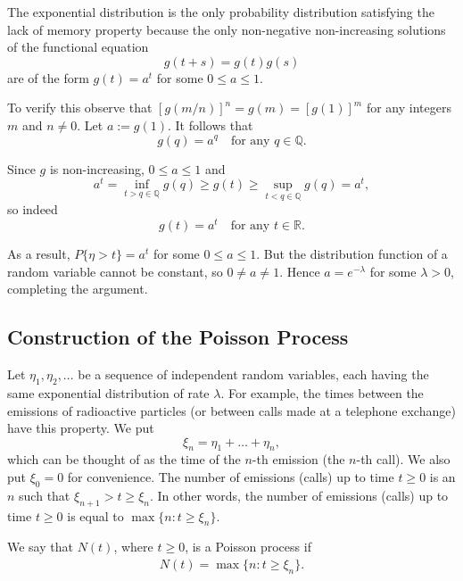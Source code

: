 \begin{Solution}
The exponential distribution is the only probability distribution satisfying the lack of memory property because the only non-negative non-increasing solutions of the functional equation
\[
g(t + s) = g(t) g(s)
\]
are of the form $g(t) = a^t$ for some $0 \leq a \leq 1$.

To verify this observe that $[g(m/n)]^n = g(m) = [g(1)]^m$ for any integers $m$ and $n \neq 0$. Let $a := g(1)$. It follows that
\[
g(q) = a^q \quad \text{for any } q \in \mathbb{Q}.
\]

Since $g$ is non-increasing, $0 \leq a \leq 1$ and
\[
a^t = \inf_{t > q \in \mathbb{Q}} g(q) \geq g(t) \geq \sup_{t < q \in \mathbb{Q}} g(q) = a^t,
\]
so indeed
\[
g(t) = a^t \quad \text{for any } t \in \mathbb{R}.
\]

As a result, $P\{\eta > t\} = a^t$ for some $0 \leq a \leq 1$. But the distribution function of a random variable cannot be constant, so $0 \neq a \neq 1$. Hence $a = e^{-\lambda}$ for some $\lambda > 0$, completing the argument.
\end{Solution}

\subsection{Construction of the Poisson Process}
\label{sec:poisson-process-construction}

Let $\eta_1, \eta_2, \ldots$ be a sequence of independent random variables, each having the same exponential distribution of rate $\lambda$. For example, the times between the emissions of radioactive particles (or between calls made at a telephone exchange) have this property. We put
\[
\xi_n = \eta_1 + \dots + \eta_n,
\]
which can be thought of as the time of the $n$-th emission (the $n$-th call). We also put $\xi_0 = 0$ for convenience. The number of emissions (calls) up to time $t \geq 0$ is an $n$ such that $\xi_{n+1} > t \geq \xi_n$. In other words, the number of emissions (calls) up to time $t \geq 0$ is equal to $\max\{n: t \geq \xi_n\}$.

\begin{Definition}
\label{def:poisson-process}
We say that $N(t)$, where $t \geq 0$, is a Poisson process if
\begin{align}
N(t) = \max\{n: t \geq \xi_n\}.
\label{eq:poisson-process-definition}
\end{align}
\end{Definition}

